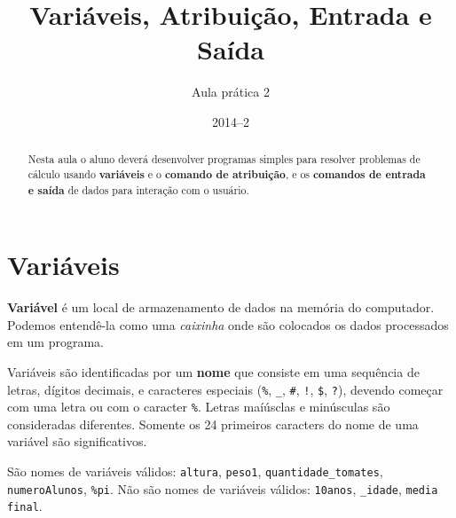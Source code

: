 \documentclass[11pt,fleqn]{practice}
\begin{document}

\subtitle{Aula prática 2}
\title{Variáveis, Atribuição, Entrada e Saída}
\date{2014--2}
\maketitle

\begin{abstract}
  Nesta aula o aluno deverá desenvolver programas simples para resolver
  problemas de cálculo usando \textbf{variáveis} e o \textbf{comando de
    atribuição}, e os \textbf{comandos de entrada e saída} de dados para
  interação com o usuário.

\end{abstract}

\tableofcontents

\section{Variáveis}

\textbf{Variável} é um local de armazenamento de dados na memória do
computador. Podemos entendê-la como uma \emph{caixinha} onde são
colocados os dados processados em um programa.

\begin{center}
\end{center}

Variáveis são identificadas por um \textbf{nome} que consiste em uma
sequência de letras, dígitos decimais, e caracteres especiais
(\texttt{\%}, \texttt{\_}, \texttt{\#}, \texttt{!}, \texttt{\$},
\texttt{?}), devendo começar com uma letra ou com o caracter
\texttt{\%}. Letras maíúsclas e minúsculas são consideradas
diferentes. Somente os 24 primeiros caracters do nome de uma variável
são significativos.

São nomes de variáveis válidos: \texttt{altura}, \texttt{peso1},
\texttt{quantidade\_tomates}, \texttt{numeroAlunos}, \texttt{\%pi}. Não
são nomes de variáveis válidos: \texttt{10anos}, \texttt{\_idade},
\texttt{media final}.
\end{document}
